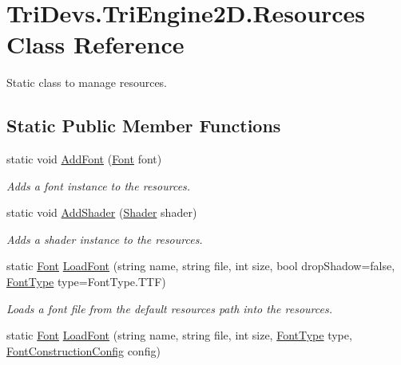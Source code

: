 \hypertarget{class_tri_devs_1_1_tri_engine2_d_1_1_resources}{\section{Tri\-Devs.\-Tri\-Engine2\-D.\-Resources Class Reference}
\label{class_tri_devs_1_1_tri_engine2_d_1_1_resources}
}


Static class to manage resources.  


\subsection*{Static Public Member Functions}
\begin{DoxyCompactItemize}
\item 
static void \hyperlink{class_tri_devs_1_1_tri_engine2_d_1_1_resources_aa529e97901e6d732b659f368fb0f532c}{Add\-Font} (\hyperlink{class_tri_devs_1_1_tri_engine2_d_1_1_text_1_1_font}{Font} font)
\begin{DoxyCompactList}\small\item\em Adds a font instance to the resources. \end{DoxyCompactList}\item 
static void \hyperlink{class_tri_devs_1_1_tri_engine2_d_1_1_resources_a7ee2414271382ccc08f969f0c4d81758}{Add\-Shader} (\hyperlink{class_tri_devs_1_1_tri_engine2_d_1_1_shaders_1_1_shader}{Shader} shader)
\begin{DoxyCompactList}\small\item\em Adds a shader instance to the resources. \end{DoxyCompactList}\item 
static \hyperlink{class_tri_devs_1_1_tri_engine2_d_1_1_text_1_1_font}{Font} \hyperlink{class_tri_devs_1_1_tri_engine2_d_1_1_resources_a4754adb7d7d7b8334501e09e34dd47e8}{Load\-Font} (string name, string file, int size, bool drop\-Shadow=false, \hyperlink{namespace_tri_devs_1_1_tri_engine2_d_1_1_text_aa624efa98f1dcfec7cddff37f08bbe75}{Font\-Type} type=Font\-Type.\-T\-T\-F)
\begin{DoxyCompactList}\small\item\em Loads a font file from the default resources path into the resources. \end{DoxyCompactList}\item 
static \hyperlink{class_tri_devs_1_1_tri_engine2_d_1_1_text_1_1_font}{Font} \hyperlink{class_tri_devs_1_1_tri_engine2_d_1_1_resources_af277ac8cbdabf2fe9d32405c81e22a1d}{Load\-Font} (string name, string file, int size, \hyperlink{namespace_tri_devs_1_1_tri_engine2_d_1_1_text_aa624efa98f1dcfec7cddff37f08bbe75}{Font\-Type} type, \hyperlink{class_tri_devs_1_1_tri_engine2_d_1_1_text_1_1_font_construction_config}{Font\-Construction\-Config} config)

\end{DoxyCompactItemize}
